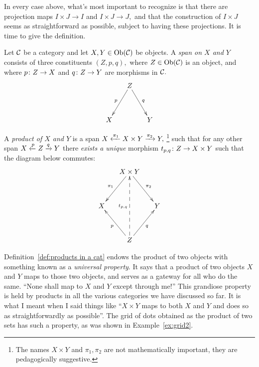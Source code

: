 \documentclass[../main/CT4S-EN-RU]{subfiles}
\begin{document}
\begin{exerciseRUS}
\end{exerciseRUS}

\begin{blockENG}
In every case above, what's most important to recognize is that there are projection maps $I\times J\to I$ and $I\times J\to J,$ and that the construction of $I\times J$ seems as straightforward as possible, subject to having these projections. It is time to give the definition.
\end{blockENG}

\begin{blockRUS}
\end{blockRUS}

\begin{definitionENG}\label{def:products in a cat}
Let $\mathcal{C}$ be a category and let $X,Y\in\operatorname{Ob}(\mathcal{C})$ be objects. A {\em span on $X$ and $Y$} consists of three constituents $(Z,p,q),$ where $Z\in\operatorname{Ob}(\mathcal{C})$ is an object, and where $p\colon Z\rightarrow X$ and $q\colon Z\rightarrow Y$ are morphisms in $\mathcal{C}.$ 
$$\xymatrix@=15pt{&Z\ar[ldd]_p\ar[rdd]^q\\\\X&&Y}$$   

A {\em product of $X$ and $Y$} is a span $X\xleftarrow{\pi_1}X\times Y\xrightarrow{\pi_2}Y,$ \footnote{The names $X\times Y$ and $\pi_1,\pi_2$ are not mathematically important, they are pedagogically suggestive.} such that for any other span $X\xleftarrow{p}Z\xrightarrow{q}Y$ there {\em exists a unique} morphism $t_{p,q}\colon Z\rightarrow X\times Y$ such that the diagram below commutes:
$$
\xymatrix@=15pt{&X\times Y\ar[ldd]_{\pi_1}\ar[rdd]^{\pi_2}\\\\X&&Y\\\\&Z\ar[uul]^{p}\ar[uur]_q\ar@{-->}[uuuu]^{t_{p,q}}}
$$
\end{definitionENG}

\begin{definitionRUS}\label{def:products in a cat}
\end{definitionRUS}

\begin{remarkENG}\label{rem:gateway}
Definition~\ref{def:products in a cat} endows the product of two objects with something known as a {\em universal property}. It says that a product of two objects $X$ and $Y$ maps to those two objects, and serves as a gateway for all who do the same. “None shall map to $X$ and $Y$ except through me!” This grandiose property is held by  products in all the various categories we have discussed so far. It is what I meant when I said things like “$X\times Y$ maps to both $X$ and $Y$ and does so as straightforwardly as possible”.  The grid of dots obtained as the product of two sets has such a property, as was shown in Example~\ref{ex:grid2}.
\end{remarkENG}
\end{document}
